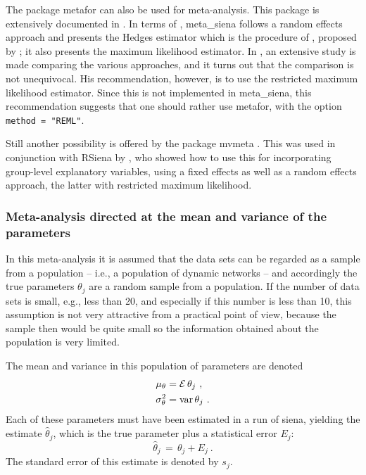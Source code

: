 \documentclass[a4paper,fleqn,11pt]{article}
\newcommand{\var}{\mbox{var}}
\newcommand{\+}{\, + \,}
\newcommand{\E}{\mbox{$\cal E$}}
\newcommand{\sfn}[1]{\textsf{#1}}
\newcommand{\RS}{{\sf \textsf{RSiena} }}
\begin{document}
The package \sfn{metafor} can also be used for meta-analysis.
This package is extensively documented in \citet{Viechtbauer2010}.
In terms of \citet{Viechtbauer2010}, \sfn{meta\_siena} follows a
random effects approach and presents the Hedges estimator
which is the procedure of \citet{SnijdersBaerveldt03}, proposed
by \citet{Cochran54}; it also presents the maximum likelihood
estimator.
In \citet{Viechtbauer2005}, an extensive study is made comparing
the various approaches, and it turns out that the comparison is
not unequivocal. His recommendation, however, is to use the
restricted maximum likelihood estimator.
Since this is not implemented in \sfn{meta\_siena}, this recommendation
suggests that one should rather use  \sfn{metafor}, with the
option \texttt{method = "REML"}.

Still another possibility is offered by the package \sfn{mvmeta}
\citep{Gasparrini2012}.
This was used in conjunction with \RS by
\citet{An2015}, who showed how to use this for incorporating
group-level explanatory variables, using a fixed effects
as well as a random effects approach, the latter with
restricted maximum likelihood.

\subsubsection{Meta-analysis directed at the mean
               and variance of the parameters}

In this meta-analysis it is assumed that the data sets can be
regarded as a sample from a population -- i.e., a population
of dynamic networks -- and accordingly the true parameters
$\theta_j$  are a random sample from a population.
If the number of data sets is small, e.g., less than 20,
and especially if this number is less than 10,
this assumption is not very attractive from a practical point of view,
because the sample then would be quite small
so the information obtained about the population is very limited.

The mean and variance in this population of parameters are denoted
\begin{align*}
 \mu_\theta &= \E\, \theta_j \ , \\
 \sigma^2_\theta &= \var\, \theta_j \ .
\end{align*}
Each of these parameters must have been estimated in a run of
\textsf{siena}, yielding the estimate $\hat\theta_j$,
which is the true parameter plus a statistical error $E_j$:
\[
\hat\theta_j \,=\, \theta_j + E_j \ .
\]
The standard error of this estimate is denoted by $s_j$.
\end{document}
